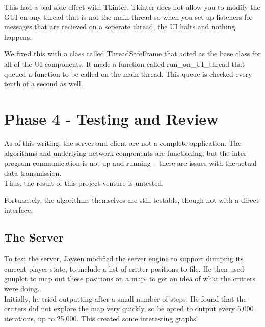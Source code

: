 This had a bad side-effect with Tkinter. Tkinter does not allow you to modify the GUI on any thread that is not the main thread so when you set up listeners for messages that are recieved on a seperate thread, the UI halts and nothing happens.

We fixed this with a class called ThreadSafeFrame that acted as the base class for all of the UI components. It made a function called run\_on\_UI\_thread that queued a function to be called on the main thread. This queue is checked every tenth of a second as well.

\section{Phase 4 - Testing and Review}
As of this writing, the server and client are not a complete application. The
algorithms and underlying network components are functioning, but the
inter-program communication is not up and running -- there are issues with the
actual data transmission. \\
Thus, the result of this project venture is untested.

Fortunately, the algorithms themselves are still testable, though not with a
direct interface.

\subsection{The Server}
To test the server, Jaysen modified the server engine to support dumping its
current player state, to include a list of critter positions to file. He then
used gnuplot to map out these positions on a map, to get an idea of what the
critters were doing. \\
Initially, he tried outputting after a small number of steps. He found that the
critters did not explore the map very quickly, so he opted to output every 5,000
iterations, up to 25,000. This created some interesting graphs!

